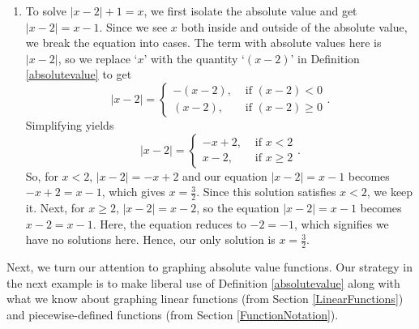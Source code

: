 {\begin{enumerate}
\item  To solve $|x-2| + 1 = x$, we first isolate the absolute value and get $|x-2| = x-1$.  Since we see $x$ both inside and outside of the absolute value, we break the equation into cases.  The term with absolute values here is $|x-2|$, so we replace `$x$' with the quantity `$(x-2)$' in Definition \ref{absolutevalue} to get 
\[ 
|x-2| = \begin{cases} -(x-2), & \mbox{ if }  (x-2) < 0  \\
					   (x-2), & \mbox{ if }  (x-2) \geq 0
		\end{cases}.
\]
Simplifying yields 
\[
 |x-2| = \begin{cases} -x+2, & \mbox{ if }  x < 2 \\
 					    x-2, & \mbox{ if }  x \geq 2 
 		 \end{cases}.
\]
So, for $x<2$, $|x-2| = -x+2$ and our equation  $|x-2| = x-1$ becomes $-x+2 = x-1$, which gives $x = \frac{3}{2}$.  Since this solution satisfies $x < 2$, we keep it.  Next, for $x \geq 2$, $|x-2| = x-2$, so the equation $|x-2| = x-1$ becomes $x-2 = x-1$.  Here, the equation reduces to $-2 = -1$, which signifies we have no solutions here.  Hence, our only solution is $x = \frac{3}{2}$. 

\end{enumerate}
}

\medskip

Next, we turn our attention to graphing absolute value functions.  Our strategy in the next example is to make liberal use of Definition \ref{absolutevalue} along with what we know about graphing linear functions (from Section \ref{LinearFunctions}) and piecewise-defined functions (from Section \ref{FunctionNotation}).

\pagebreak

